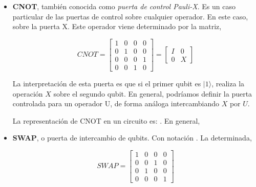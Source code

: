  \begin{itemize}
     \item \textbf{CNOT}, también conocida como \textit{puerta de control Pauli-X}. Es un caso particular de las puertas de control sobre cualquier operador. En este caso, sobre la puerta X. \newline 
     Este operador viene determinado por la matriz, 
     
     \begin{equation*}
     CNOT = \begin{bmatrix} 1 & 0 & 0 & 0\\0 & 1 & 0 & 0\\0 & 0 & 0 & 1\\0 & 0 & 1 & 0 \end{bmatrix}=\begin{bmatrix} I & 0  \\ 0 & X \end{bmatrix}
     \end{equation*}
     
     La interpretación de esta puerta es que si el primer qubit es $|1\rangle$, realiza la operación $X$ sobre el segundo qubit. En general, podríamos definir la puerta controlada para un operador U, de forma análoga intercambiando $X$ por $U$.\newline 
     
     La representación de CNOT en un circuito es: 
     . En general,
     
     \item \textbf{SWAP}, o puerta de intercambio de qubits. Con notación  . La determinada,
     
     \begin{equation*}
     SWAP = \begin{bmatrix}
         1 & 0 & 0 & 0 \\ 0 & 0 & 1 & 0 \\ 0 & 1 & 0 & 0 \\ 0 & 0 & 0 & 1
     \end{bmatrix} \end{equation*}
     

\end{itemize}
